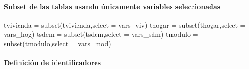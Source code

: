 \documentclass[
]{article}
\newenvironment{Shaded}{\begin{snugshade}}{\end{snugshade}}
\newcommand{\AttributeTok}[1]{\textcolor[rgb]{0.77,0.63,0.00}{#1}}
\newcommand{\FunctionTok}[1]{\textcolor[rgb]{0.00,0.00,0.00}{#1}}
\newcommand{\NormalTok}[1]{#1}
\newcommand{\OtherTok}[1]{\textcolor[rgb]{0.56,0.35,0.01}{#1}}
\newcommand{\SpecialCharTok}[1]{\textcolor[rgb]{0.00,0.00,0.00}{#1}}
\newcommand{\StringTok}[1]{\textcolor[rgb]{0.31,0.60,0.02}{#1}}
\begin{document}
\begin{Shaded}
\end{Shaded}

\hypertarget{subset-de-las-tablas-usando-uxfanicamente-variables-seleccionadas}{%
\paragraph{Subset de las tablas usando únicamente variables
seleccionadas}\label{subset-de-las-tablas-usando-uxfanicamente-variables-seleccionadas}}

\begin{Shaded}
\begin{Highlighting}[]
\NormalTok{tvivienda }\OtherTok{=} \FunctionTok{subset}\NormalTok{(tvivienda,}\AttributeTok{select =}\NormalTok{ vars\_viv)}
\NormalTok{thogar }\OtherTok{=} \FunctionTok{subset}\NormalTok{(thogar,}\AttributeTok{select =}\NormalTok{ vars\_hog)}
\NormalTok{tsdem }\OtherTok{=} \FunctionTok{subset}\NormalTok{(tsdem,}\AttributeTok{select =}\NormalTok{ vars\_sdm)}
\NormalTok{tmodulo }\OtherTok{=} \FunctionTok{subset}\NormalTok{(tmodulo,}\AttributeTok{select =}\NormalTok{ vars\_mod)}
\end{Highlighting}
\end{Shaded}

\hypertarget{definiciuxf3n-de-identificadores}{%
\paragraph{Definición de
identificadores}\label{definiciuxf3n-de-identificadores}}
\end{document}
